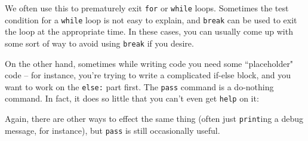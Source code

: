 \documentclass[m3380-lec-main.tex]{subfiles}
\begin{document}
\smallskip\noindent
We often use this to prematurely exit \verb|for| or \verb|while| loops. Sometimes the test condition for a \verb|while| loop is not easy to explain, and \verb|break| can be used to exit the loop at the appropriate time. In these cases, you can usually come up with some sort of way to avoid using \verb|break| if you desire. 

\smallskip\noindent

On the other hand, sometimes while writing code you need some ``placeholder" code -- for instance, you're trying to write a complicated if-else block, and you want to work on the \verb|else:| part first. The \verb|pass| command is a do-nothing command. In fact, it does so little that you can't even get \verb|help| on it:

\smallskip\noindent

Again, there are other ways to effect the same thing (often just \verb|print|ing a debug message, for instance), but \verb|pass| is still occasionally useful.
\end{document}
